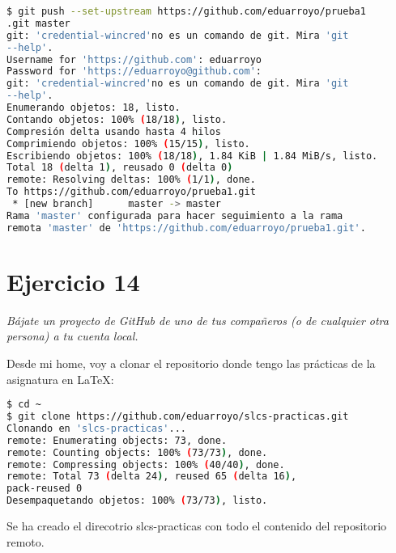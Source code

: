 \begin{lstlisting}[xleftmargin=.16\textwidth,language=bash]
$ git push --set-upstream https://github.com/eduarroyo/prueba1
.git master
git: 'credential-wincred'no es un comando de git. Mira 'git 
--help'.
Username for 'https://github.com': eduarroyo
Password for 'https://eduarroyo@github.com': 
git: 'credential-wincred'no es un comando de git. Mira 'git
--help'.
Enumerando objetos: 18, listo.
Contando objetos: 100% (18/18), listo.
Compresión delta usando hasta 4 hilos
Comprimiendo objetos: 100% (15/15), listo.
Escribiendo objetos: 100% (18/18), 1.84 KiB | 1.84 MiB/s, listo.
Total 18 (delta 1), reusado 0 (delta 0)
remote: Resolving deltas: 100% (1/1), done.
To https://github.com/eduarroyo/prueba1.git
 * [new branch]      master -> master
Rama 'master' configurada para hacer seguimiento a la rama 
remota 'master' de 'https://github.com/eduarroyo/prueba1.git'.
\end{lstlisting}

\section{Ejercicio 14}
\begin{center}
    \parbox{12cm}{\justify\textit{
        Bájate un proyecto de GitHub de uno de tus compañeros (o de cualquier otra  persona) a tu cuenta local.
    }}
\end{center}

Desde mi home, voy a clonar el repositorio donde tengo las prácticas de la asignatura en \LaTeX :
\begin{lstlisting}[xleftmargin=.16\textwidth,language=bash]
$ cd ~ 
$ git clone https://github.com/eduarroyo/slcs-practicas.git
Clonando en 'slcs-practicas'...
remote: Enumerating objects: 73, done.
remote: Counting objects: 100% (73/73), done.
remote: Compressing objects: 100% (40/40), done.
remote: Total 73 (delta 24), reused 65 (delta 16),
pack-reused 0
Desempaquetando objetos: 100% (73/73), listo.
\end{lstlisting}
Se ha creado el direcotrio slcs-practicas con todo el contenido del repositorio remoto.
